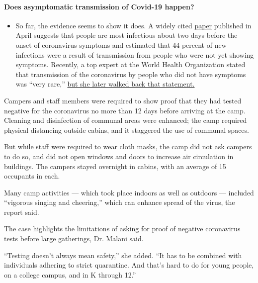 \begin{itemize}
{  \paragraph{Does asymptomatic transmission of Covid-19
  happen?}\label{does-asymptomatic-transmission-of-covid-19-happen}}

  \begin{itemize}
  \tightlist
  \item
    So far, the evidence seems to show it does. A widely cited
    \href{https://www.nature.com/articles/s41591-020-0869-5}{paper}
    published in April suggests that people are most infectious about
    two days before the onset of coronavirus symptoms and estimated that
    44 percent of new infections were a result of transmission from
    people who were not yet showing symptoms. Recently, a top expert at
    the World Health Organization stated that transmission of the
    coronavirus by people who did not have symptoms was ``very rare,''
    \href{https://www.nytimes.com/2020/06/09/world/coronavirus-updates.html?action=click\&pgtype=Article\&state=default\&region=MAIN_CONTENT_3\&context=storylines_faq\#link-1f302e21}{but
    she later walked back that statement.}
  \end{itemize}
\end{itemize}

Campers and staff members were required to show proof that they had
tested negative for the coronavirus no more than 12 days before arriving
at the camp. Cleaning and disinfection of communal areas were enhanced;
the camp required physical distancing outside cabins, and it staggered
the use of communal spaces.

But while staff were required to wear cloth masks, the camp did not ask
campers to do so, and did not open windows and doors to increase air
circulation in buildings. The campers stayed overnight in cabins, with
an average of 15 occupants in each.

Many camp activities --- which took place indoors as well as outdoors
--- included ``vigorous singing and cheering,'' which can enhance spread
of the virus, the report said.

The case highlights the limitations of asking for proof of negative
coronavirus tests before large gatherings, Dr. Malani said.

``Testing doesn't always mean safety,'' she added. ``It has to be
combined with individuals adhering to strict quarantine. And that's hard
to do for young people, on a college campus, and in K through 12.''

